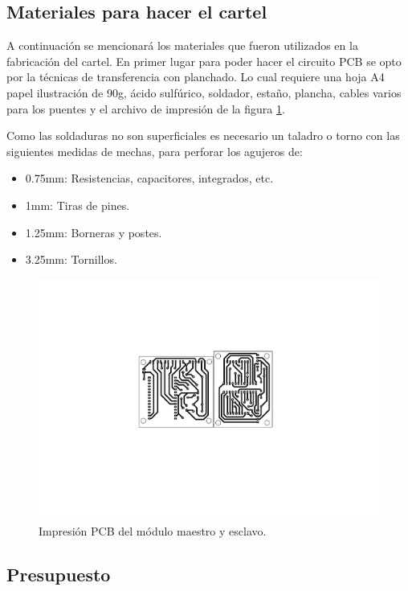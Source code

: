 \subsection{Materiales para hacer el cartel}\label{sec:materiales-para-hacer-cartel}

 A continuación se mencionará los materiales que fueron utilizados en la fabricación del cartel.
 En primer lugar para poder hacer el circuito PCB se opto por la técnicas de transferencia con planchado.
 Lo cual requiere una hoja A4 papel ilustración de 90g, ácido sulfúrico, soldador, estaño, plancha, cables varios para los puentes y el archivo de impresión de la figura \ref{fig:imp-pcb}.

 Como las soldaduras no son superficiales es necesario un taladro o torno con las siguientes medidas de mechas, para perforar los agujeros de:
 \begin{itemize}
     \item 0.75mm: Resistencias, capacitores, integrados, etc.
     \item 1mm: Tiras de pines.
     \item 1.25mm: Borneras y postes.
     \item 3.25mm: Tornillos.
 \end{itemize}

 \begin{figure}[ht!]
	\centering
	\includegraphics[width=\linewidth]{imagenes/hw/imp.pdf}
	\caption{Impresión PCB del módulo maestro y esclavo.}
	\label{fig:imp-pcb}
\end{figure}

\subsection{Presupuesto} \label{sec:presupuesto}

